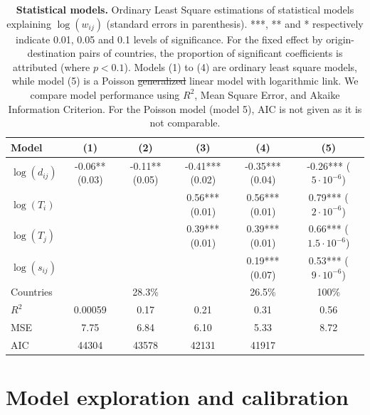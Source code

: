 \documentclass[10pt,letterpaper]{article}
\providecommand{\DIFadd}[1]{{\protect\color{blue}\uwave{#1}}} %
\providecommand{\DIFdel}[1]{{\protect\color{red}\sout{#1}}}                      %
\providecommand{\DIFaddFL}[1]{\DIFadd{#1}} %
\providecommand{\DIFdelFL}[1]{\DIFdel{#1}} %
\providecommand{\DIFaddbeginFL}{} %
\providecommand{\DIFaddendFL}{} %
\providecommand{\DIFdelbeginFL}{} %
\providecommand{\DIFdelendFL}{} %
\begin{document}
\begin{table}[!ht]
\begin{adjustwidth}{-1in}{0in}
\caption{{\bf Statistical models.} Ordinary Least Square estimations of statistical models explaining $\log(w_{ij})$ (standard errors in parenthesis). ***, ** and * respectively indicate 0.01, 0.05 and 0.1 levels of significance. For the fixed effect by origin-destination pairs of countries, the proportion of significant coefficients is attributed (where $p<0.1$). Models (1) to (4) are ordinary least square models, while model (5) is a Poisson \DIFdelbeginFL \DIFdelFL{generalized }\DIFdelendFL \DIFaddbeginFL \DIFaddFL{generalised }\DIFaddendFL linear model with logarithmic link. We compare model performance using $R^2$, Mean Square Error, and Akaike Information Criterion. For the Poisson model (model 5), AIC is not given as it is not comparable. \label{tab:reg}}
\medskip
\begin{tabular}{|l|c|c|c|c|c|}
\hline
Model  & (1) & (2) & (3) & (4) & (5) \\ 
\hline
$\log(d_{ij})$ &      -0.06** (0.03) &   -0.11** (0.05)  & -0.41*** (0.02)  & -0.35*** (0.04)  &  -0.26*** ($5\cdot 10^{-6}$) \\
$\log(T_i)$ &   &   & 0.56*** (0.01) &  0.56*** (0.01) & 0.79*** ($2\cdot 10^{-6}$) \\
$\log(T_j)$ &     &   & 0.39*** (0.01) &  0.39*** (0.01) & 0.66***  ($1.5\cdot 10^{-6}$) \\
$\log(s_{ij})$ &     &   &  &  0.19*** (0.07) & 0.53*** ($9\cdot 10^{-6}$)  \\
Countries &    &  28.3\% &   &  26.5\% & 100\% \\
\hline
$R^2$ &       0.00059   &  0.17 & 0.21 &  0.31  &  0.56 \\
MSE & 7.75 & 6.84 & 6.10 & 5.33 & 8.72 \\
AIC &        44304   &  43578  &  42131  & 41917 &   \\
\hline
\end{tabular}
\end{adjustwidth}
\end{table}





\section*{Model exploration and calibration}
\end{document}
